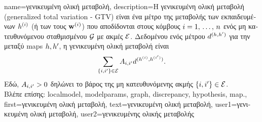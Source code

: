 {name={\foreignlanguage{greek}{γενικευμένη ολική μεταβολή}}, 
	description={\foreignlanguage{greek}{Η γενικευμένη ολική μεταβολή} (generalized total variation - GTV) 
		\foreignlanguage{greek}{είναι ένα μέτρο της μεταβολής των εκπαιδευμένων} 
		 $h^{(i)}$ (\foreignlanguage{greek}{ή των}  
		\foreignlanguage{greek}{τους} $\mathbf{w}^{(i)}$) \foreignlanguage{greek}{που αποδίδονται στους κόμβους 
		$i=1, \,\ldots, \,n$ ενός μη κατευθυνόμενου σταθμισμένου}  $\mathcal{G}$ 
		\foreignlanguage{greek}{με ακμές $\mathcal{E}$. Δεδομένου ενός μέτρου $d^{(h,h')}$ 
		για την}  \foreignlanguage{greek}{μεταξύ} \gls{map}s  
		$h,h'$, \foreignlanguage{greek}{η γενικευμένη ολική μεταβολή είναι}
		\begin{equation} 
			\nonumber
			\sum_{\{i,i'\}\in \mathcal{E}} A_{i,i'} 
			d^{(h^{(i)},h^{(i')})}.
		\end{equation}
		\foreignlanguage{greek}{Εδώ, $A_{i,i'}>0$ δηλώνει το βάρος της μη κατευθυνόμενης ακμής} 
		$\{i,i'\}\in \mathcal{E}$. \\
		\foreignlanguage{greek}{Βλέπε επίσης:} \gls{localmodel}, \gls{modelparams}, \gls{graph}, \gls{discrepancy}, \gls{hypothesis}, \gls{map}.},
	first={\foreignlanguage{greek}{γενικευμένη ολική μεταβολή}},
	text={\foreignlanguage{greek}{γενικευμένη ολική μεταβολή}},
	user1={\foreignlanguage{greek}{γενικευμένη ολική μεταβολή}}, %
  	user2={\foreignlanguage{greek}{γενικευμένης ολικής μεταβολής}} %
}

